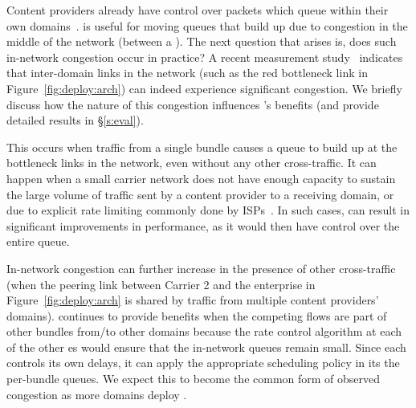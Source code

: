 Content providers already have control over packets which queue within their own domains~\cite{swan, b4, bwe}. \name is useful for moving queues that build up due to congestion in the middle of the network (\ie between a \pair).
The next question that arises is, does such in-network congestion occur in practice? A recent measurement study~\cite{inferring-interdomain-congestion} indicates that inter-domain links in the network (such as the red bottleneck link in Figure~\ref{fig:deploy:arch}) can indeed experience significant congestion. 
We briefly discuss how the nature of this congestion influences \name's benefits (and provide detailed results in \S\ref{s:eval}).

 This occurs when traffic from a single bundle causes a queue to build up at the bottleneck links in the network, even without any other cross-traffic. It can happen when a small carrier network does not have enough capacity to sustain the large volume of traffic sent by a content provider to a receiving domain, or due to explicit rate limiting commonly done by ISPs~\cite{isp-throttle-1, isp-throttle-2, isp-throttle-3}. In such cases, \name can result in
significant improvements in performance, as it would then have control over the entire queue. 

 In-network congestion can further increase in the presence of other cross-traffic (\eg when the peering link between Carrier 2 and the enterprise in Figure~\ref{fig:deploy:arch} is shared by traffic from multiple content providers' domains). 
\name continues to provide benefits when the competing flows are part of other bundles from/to other domains because the rate control algorithm at each of the other {\inbox}es would ensure that the in-network queues remain small. Since each \inbox controls its own delays, it can apply the appropriate scheduling policy in its the per-bundle queues.
We expect this to become the common form of observed congestion as more domains deploy \name. 

